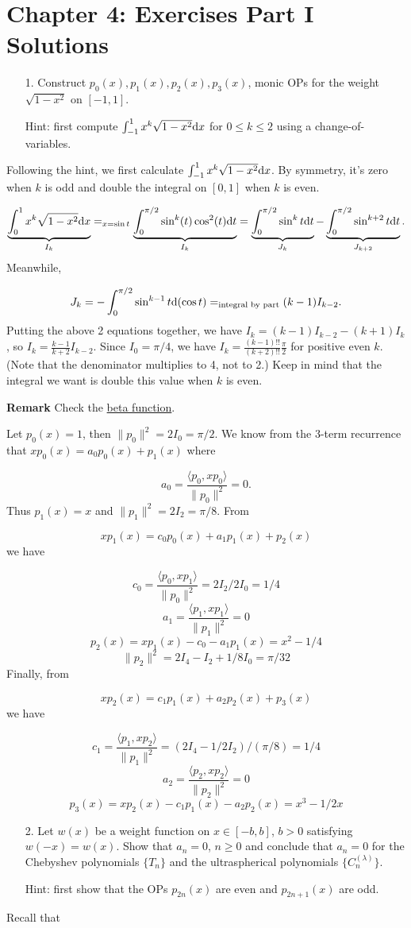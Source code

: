 \documentclass[12pt,a4paper]{article}
\begin{document}
\section{Chapter 4: Exercises Part I Solutions}
\begin{itemize}
\item[1. ] Construct  $p_0(x),p_1(x),p_2(x),p_3(x)$, monic OPs for the weight $\sqrt{1-x^2}$ on $[-1,1]$.

Hint: first compute $\int_{-1}^1 x^k \sqrt{1-x^2} {\rm d} x$ for $0 \ensuremath{\leq} k \ensuremath{\leq} 2$ using a change-of-variables.

\end{itemize}
Following the hint, we first calculate $\int_{-1}^1 x^k\sqrt{1-x^2}{\rm d}x$. By symmetry, it's zero when $k$ is odd and double the integral on $[0,1]$ when $k$ is even. 

\[
\underbrace{\int_0^1 x^k\sqrt{1-x^2}{\rm d}x}_{I_k}=_{x=\sin t}\underbrace{\int_0^{\pi/2}\sin^k(t)\cos^2(t){\rm d}t}_{I_k}=\underbrace{\int_0^{\pi/2}\sin^k t{\rm d}t}_{J_k}-\underbrace{\int_0^{\pi/2}\sin^{k+2}t{\rm d}t}_{J_{k+2}}.
\]
Meanwhile, 

\[
J_k=-\int_0^{\pi/2}\sin^{k-1}t{\rm d}(\cos t)=_{\text{integral by part}}(k-1)I_{k-2}.
\]
Putting the above 2 equations together, we have $I_k=(k-1)I_{k-2}-(k+1)I_k$, so $I_k=\frac{k-1}{k+2}I_{k-2}$. Since $I_0=\pi/4$, we have $I_k=\frac{(k-1)!!}{(k+2)!!}\frac{\pi}{2}$ for positive even $k$. (Note that the denominator multiplies to 4, not to 2.) Keep in mind that the integral we want is double this value when $k$ is even.

\textbf{Remark} Check the \href{https://en.wikipedia.org/wiki/Beta_function}{beta function}.

Let $p_0(x)=1$, then $\|p_0\|^2=2I_0=\pi/2$. We know from the 3-term recurrence that $xp_0(x)=a_0p_0(x)+p_1(x)$ where

\[
a_0=\frac{\langle p_0,xp_0\rangle}{\|p_0\|^2}=0.
\]
Thus $p_1(x)=x$ and $\|p_1\|^2=2I_2=\pi/8$. From

\[
xp_1(x)=c_0p_0(x)+a_1p_1(x)+p_2(x)
\]
we have

\[
c_0=\frac{\langle p_0,xp_1\rangle}{\|p_0\|^2}=2I_2/2I_0=1/4
\]
\[
a_1=\frac{\langle p_1,xp_1\rangle}{\|p_1\|^2}=0
\]
\[
p_2(x)=xp_1(x)-c_0-a_1p_1(x)=x^2-1/4
\]
\[
\|p_2\|^2=2I_4-I_2+1/8I_0=\pi/32
\]
Finally, from

\[
xp_2(x)=c_1p_1(x)+a_2p_2(x)+p_3(x)
\]
we have

\[
c_1=\frac{\langle p_1,xp_2\rangle}{\|p_1\|^2}=(2I_4-1/2I_2)/(\pi/8)=1/4
\]
\[
a_2=\frac{\langle p_2,xp_2\rangle}{\|p_2\|^2}=0
\]
\[
p_3(x)=xp_2(x)-c_1p_1(x)-a_2p_2(x)=x^3-1/2x
\]
\begin{itemize}
\item[2. ] Let $w(x)$ be a weight function on $x \in [-b, b]$, $b > 0$ satisfying $w(-x) = w(x)$. Show that $a_n = 0$, $n \geq 0$ and conclude that $a_n = 0$ for the Chebyshev polynomials $\lbrace T_n \rbrace$ and the ultraspherical polynomials $\lbrace C_n^{(\lambda)}\rbrace$.

Hint: first show that the OPs $p_{2n}(x)$ are even and $p_{2n+1}(x)$ are odd.

\end{itemize}
Recall that 
\end{document}

